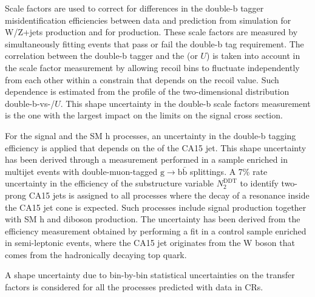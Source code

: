 Scale factors are used to correct for differences in the double-b tagger misidentification efficiencies between data and prediction from simulation for W/Z+jets production and for \ttbar production. These scale factors are measured by simultaneously fitting events that pass or fail the double-b tag requirement. The correlation between the double-b tagger and the \ptmiss (or $U$) is taken into account in the scale factor measurement by allowing recoil bins to fluctuate independently from each other within a constrain that depends on the recoil value. Such dependence is estimated from the profile of the two-dimensional distribution double-b-vs-\ptmiss/$U$. This shape uncertainty in the double-b scale factors measurement is the one with the largest impact on the limits on the signal cross section.

For the signal and the SM h processes, an uncertainty in the double-b tagging efficiency is applied that depends on the \pt of the CA15 jet. This shape uncertainty has been derived through a measurement performed in a sample enriched in multijet events with double-muon-tagged $\text{g}\to\text{b}\bar{\text{b}}$ splittings. A 7\% rate uncertainty in the efficiency of the substructure variable $N_2^\text{DDT}$ to identify two-prong CA15 jets is assigned to all processes where the decay of a resonance inside the CA15 jet cone is expected. Such processes include signal production together with SM h and diboson production. The uncertainty has been derived from the efficiency measurement obtained by performing a fit in a control sample enriched in semi-leptonic \ttbar events, where the CA15 jet originates from the W boson that comes from the hadronically decaying top quark. 


A shape uncertainty due to bin-by-bin statistical uncertainties on the transfer factors is considered for all the processes predicted with data in CRs.

